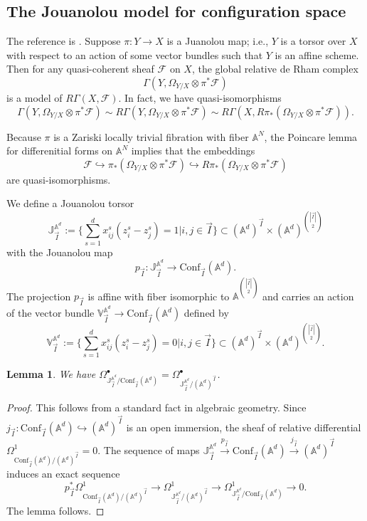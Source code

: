 \documentclass[11pt]{amsart}
\newtheorem{lem}[thm]{Lemma}
\theoremstyle{definition}
\theoremstyle{remark}
\numberwithin{equation}{section}
\begin{document}
\subsection{The Jouanolou model for configuration space}
The reference is \cite[Section 4.1.3, pp279]{beilinson2004chiral}. Suppose $\pi:Y\rightarrow X$ is a Juanolou map; i.e., $Y$ is a torsor over $X$ with respect to an action of some vector bundles such that $Y$ is an affine scheme. Then for any quasi-coherent sheaf $\mathcal{F}$ on $X$, the global relative de Rham complex
$$
\Gamma(Y,\Omega_{Y/X}\otimes\pi^*\mathcal{F})
$$
is a model of $R\Gamma(X,\mathcal{F})$. In fact, we have quasi-isomorphisms
$$
\Gamma(Y,\Omega_{Y/X}\otimes\pi^*\mathcal{F})\sim R\Gamma(Y,\Omega_{Y/X}\otimes\pi^*\mathcal{F})\sim R\Gamma(X,R\pi_*(\Omega_{Y/X}\otimes\pi^*\mathcal{F})).
$$




Because $\pi$ is a Zariski locally trivial fibration with fiber $\mathbb{A}^N$, the Poincare lemma for differenitial forms on $\mathbb{A}^N$ implies that the embeddings
$$
\mathcal{F}\hookrightarrow \pi_*(\Omega_{Y/X}\otimes\pi^*\mathcal{F})\hookrightarrow R\pi_*(\Omega_{Y/X}\otimes\pi^*\mathcal{F})
$$
are quasi-isomorphisms.

We define a Jouanolou torsor
$$
\mathbb{J}^{\mathbb{A}^d}_{\vec{I}}:=\{\sum_{s=1}^d x_{ij}^s(z^s_i-z^s_j)=1|i,j\in \vec{I}\}\subset (\mathbb{A}^d)^{\vec{I}}\times (\mathbb{A}^d)^{\binom{|\vec{I}|}{2}}
$$
with the Jouanolou map
$$
p_{\vec{I}}:\mathbb{J}^{\mathbb{A}^d}_{\vec{I}}\rightarrow \mathrm{Conf}_{\vec{I}}(\mathbb{A}^d).
$$
The projection $p_{\vec{I}}$ is affine with fiber isomorphic to $\mathbb{A}^{\binom{|\vec{I}|}{2}}$ and carries an action of the vector bundle $\mathbb{V}^{\mathbb{A}^d}_{\vec{I}}\rightarrow \mathrm{Conf}_{\vec{I}}(\mathbb{A}^d)$ defined by
$$
\mathbb{V}^{\mathbb{A}^d}_{\vec{I}}:=\{\sum_{s=1}^d x_{ij}^s(z^s_i-z^s_j)=0|i,j\in \vec{I}\}\subset (\mathbb{A}^d)^{\vec{I}}\times (\mathbb{A}^d)^{\binom{|\vec{I}|}{2}}.
$$
\begin{lem}
    We have $\Omega^{\bullet}_{\mathbb{J}^{\mathbb{A}^d}_{\vec{I}}/\mathrm{Conf}_{\vec{I}}(\mathbb{A}^d)}=\Omega^{\bullet}_{\mathbb{J}^{\mathbb{A}^d}_{\vec{I}}/(\mathbb{A}^d)^{\vec{I}}}$.
\end{lem}

\begin{proof}
This follows from a standard fact in algebraic geometry. Since $j_{\vec{I}}: \mathrm{Conf}_{\vec{I}}(\mathbb{A}^d)\hookrightarrow (\mathbb{A}^d)^{\vec{I}}$ is an open immersion, the sheaf of relative differential $\Omega^1_{\mathrm{Conf}_{\vec{I}}(\mathbb{A}^d)/(\mathbb{A}^d)^{\vec{I}}}=0$. The sequence of maps $\mathbb{J}^{\mathbb{A}^d}_{\vec{I}}\xrightarrow{p_{\vec{I}}}\mathrm{Conf}_{\vec{I}}(\mathbb{A}^d)\xrightarrow{j_{\vec{I}}}(\mathbb{A}^d)^{\vec{I}}$ induces an exact sequence
$$
p^*_{\vec{I}}\Omega^1_{\mathrm{Conf}_{\vec{I}}(\mathbb{A}^d)/(\mathbb{A}^d)^{\vec{I}}}\rightarrow\Omega^{1}_{\mathbb{J}^{\mathbb{A}^d}_{\vec{I}}/(\mathbb{A}^d)^{\vec{I}}}\rightarrow  \Omega^{1}_{\mathbb{J}^{\mathbb{A}^d}_{\vec{I}}/\mathrm{Conf}_{\vec{I}}(\mathbb{A}^d)}\rightarrow 0.
$$
The lemma follows.

\end{proof}
\end{document}
